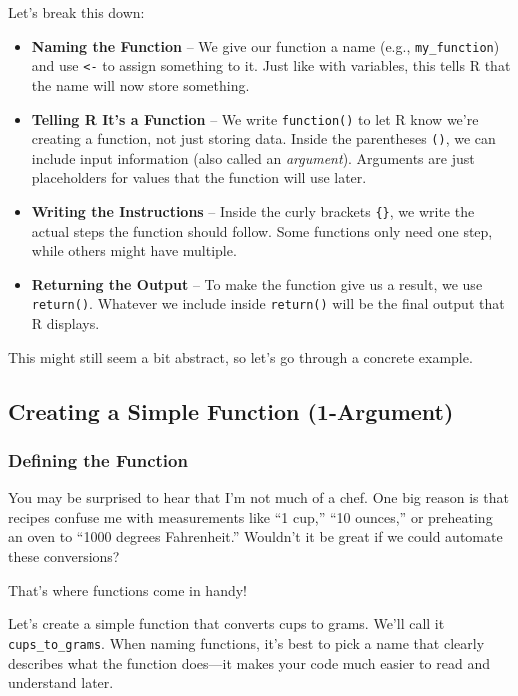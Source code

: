 \documentclass[
]{book}
\begin{document}
Let's break this down:

\begin{itemize}
\item
  \textbf{Naming the Function} -- We give our function a name (e.g., \texttt{my\_function}) and use \texttt{\textless{}-} to assign something to it. Just like with variables, this tells R that the name will now store something.
\item
  \textbf{Telling R It's a Function} -- We write \texttt{function()} to let R know we're creating a function, not just storing data. Inside the parentheses \texttt{()}, we can include input information (also called an \emph{argument}). Arguments are just placeholders for values that the function will use later.
\item
  \textbf{Writing the Instructions} -- Inside the curly brackets \texttt{\{\}}, we write the actual steps the function should follow. Some functions only need one step, while others might have multiple.
\item
  \textbf{Returning the Output} -- To make the function give us a result, we use \texttt{return()}. Whatever we include inside \texttt{return()} will be the final output that R displays.
\end{itemize}

This might still seem a bit abstract, so let's go through a concrete example.

\subsection{Creating a Simple Function (1-Argument)}\label{creating-a-simple-function-1-argument}

\subsubsection{\texorpdfstring{\textbf{Defining the Function}}{Defining the Function}}\label{defining-the-function}

You may be surprised to hear that I'm not much of a chef. One big reason is that recipes confuse me with measurements like ``1 cup,'' ``10 ounces,'' or preheating an oven to ``1000 degrees Fahrenheit.'' Wouldn't it be great if we could automate these conversions?

That's where functions come in handy!

Let's create a simple function that converts cups to grams. We'll call it \texttt{cups\_to\_grams}. When naming functions, it's best to pick a name that clearly describes what the function does---it makes your code much easier to read and understand later.
\end{document}
